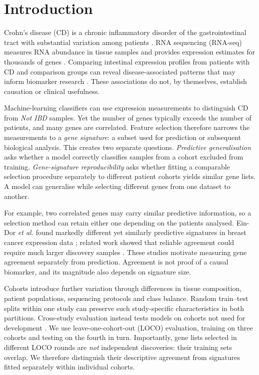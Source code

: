\section{Introduction}
\label{sec:introduction}
Crohn's disease (CD) is a chronic inflammatory disorder of the gastrointestinal tract with substantial variation among patients \cite{torres2017crohn}. RNA sequencing (RNA-seq) measures RNA abundance in tissue samples and provides expression estimates for thousands of genes \cite{conesa2016survey}. Comparing intestinal expression profiles from patients with CD and comparison groups can reveal disease-associated patterns that may inform biomarker research \cite{montesi2026tentacles}. These associations do not, by themselves, establish causation or clinical usefulness.

Machine-learning classifiers can use expression measurements to distinguish CD from \emph{Not IBD} samples. Yet the number of genes typically exceeds the number of patients, and many genes are correlated. Feature selection therefore narrows the measurements to a \emph{gene signature}: a subset used for prediction or subsequent biological analysis. This creates two separate questions. \emph{Predictive generalisation} asks whether a model correctly classifies samples from a cohort excluded from training. \emph{Gene-signature reproducibility} asks whether fitting a comparable selection procedure separately to different patient cohorts yields similar gene lists. A model can generalise while selecting different genes from one dataset to another.

For example, two correlated genes may carry similar predictive information, so a selection method can retain either one depending on the patients analysed. Ein-Dor \emph{et al.} found markedly different yet similarly predictive signatures in breast cancer expression data \cite{eindor2005outcome}; related work showed that reliable agreement could require much larger discovery samples \cite{eindor2006thousands}. These studies motivate measuring gene agreement separately from prediction. Agreement is not proof of a causal biomarker, and its magnitude also depends on signature size.

Cohorts introduce further variation through differences in tissue composition, patient populations, sequencing protocols and class balance. Random train--test splits within one study can preserve such study-specific characteristics in both partitions. Cross-study evaluation instead tests models on cohorts not used for development \cite{bernau2014cross}. We use leave-one-cohort-out (LOCO) evaluation, training on three cohorts and testing on the fourth in turn. Importantly, gene lists selected in different LOCO rounds are \emph{not} independent discoveries: their training sets overlap. We therefore distinguish their descriptive agreement from signatures fitted separately within individual cohorts.


